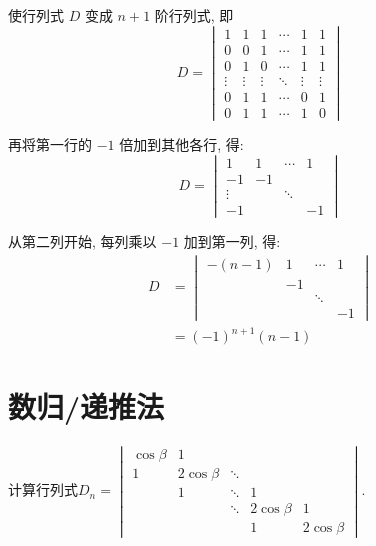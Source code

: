 \begin{solution}
    使行列式 $D$ 变成 $n+1$ 阶行列式, 即
    \[ D=\begin{vmatrix}
            1      & 1      & 1      & \cdots & 1      & 1      \\
            0      & 0      & 1      & \cdots & 1      & 1      \\
            0      & 1      & 0      & \cdots & 1      & 1      \\
            \vdots & \vdots & \vdots & \ddots & \vdots & \vdots \\
            0      & 1      & 1      & \cdots & 0      & 1      \\
            0      & 1      & 1      & \cdots & 1      & 0
        \end{vmatrix} \]

    再将第一行的 $-1$ 倍加到其他各行, 得:
    \[ D =\begin{vmatrix}
            1      & 1  & \cdots & 1  \\
            -1     & -1 &        &    \\
            \vdots &    & \ddots &    \\
            -1     &    &        & -1
        \end{vmatrix} \]

    从第二列开始, 每列乘以 $-1$ 加到第一列, 得:
    \begin{align*}
        D & =\begin{vmatrix}
                 -(n-1) & 1  & \cdots & 1  \\
                        & -1 &        &    \\
                        &    & \ddots &    \\
                        &    &        & -1
             \end{vmatrix} \\
          & =(-1)^{n+1}(n-1)
    \end{align*}
\end{solution}

\section{数归/递推法}

\begin{example} \label{ex:14:递推法}
    计算行列式$D_n=\begin{vmatrix}
            \cos \beta & 1            &        &              &              \\
            1          & 2 \cos \beta & \ddots &              &              \\
                       & 1            & \ddots & 1            &              \\
                       &              & \ddots & 2 \cos \beta & 1            \\
                       &              &        & 1            & 2 \cos \beta
        \end{vmatrix}$.
\end{example}

